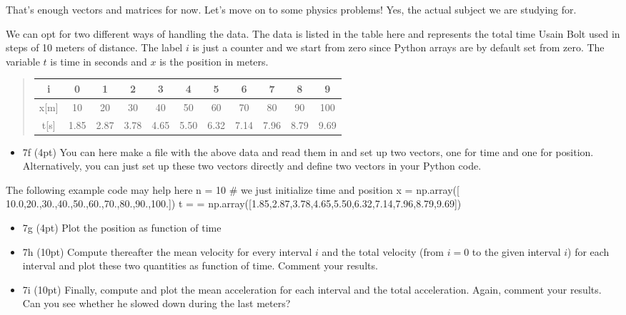 \documentclass[%
oneside,                 %
final,                   %
10pt]{article}
\begin{document}
That's enough vectors and matrices for now. Let's move on to some physics problems! Yes, the actual subject we are studying for. 

We can opt for two different ways of handling the data. The data is listed in the table here and represents the total time Usain Bolt used in steps of  10 meters of distance. The label $i$ is just a counter and we start from zero since Python arrays are by default set from zero. The variable $t$ is time in seconds and $x$ is the position in meters.


\begin{quote}
\begin{tabular}{ccccccccccc}
\hline
\multicolumn{1}{c}{ i } & \multicolumn{1}{c}{ 0 } & \multicolumn{1}{c}{ 1 } & \multicolumn{1}{c}{ 2 } & \multicolumn{1}{c}{ 3 } & \multicolumn{1}{c}{ 4 } & \multicolumn{1}{c}{ 5 } & \multicolumn{1}{c}{ 6 } & \multicolumn{1}{c}{ 7 } & \multicolumn{1}{c}{ 8 } & \multicolumn{1}{c}{ 9 } \\
\hline
x[m] & 10   & 20   & 30   & 40   & 50   & 60   & 70   & 80   & 90   & 100  \\
\hline
t[s] & 1.85 & 2.87 & 3.78 & 4.65 & 5.50 & 6.32 & 7.14 & 7.96 & 8.79 & 9.69 \\
\hline
\end{tabular}
\end{quote}

\noindent
\begin{itemize}
\item 7f (4pt) You can here make a file with the above data and read them in and set up two vectors, one for time and one for position. Alternatively, you can just set up these two vectors directly and define two vectors in your Python code.
\end{itemize}

\noindent
The following example code may help here
\bpycod
n = 10
# we just initialize time and position
x = np.array([ 10.0,20.,30.,40.,50.,60.,70.,80.,90.,100.])
t = = np.array([1.85,2.87,3.78,4.65,5.50,6.32,7.14,7.96,8.79,9.69])
\epycod

\begin{itemize}
\item 7g (4pt) Plot the position as function of time

\item 7h (10pt) Compute thereafter the mean velocity for every interval $i$ and the total velocity (from $i=0$ to the given interval $i$) for each interval and plot these two quantities as function of time. Comment your results.

\item 7i (10pt) Finally, compute and plot the mean acceleration for each interval and the total acceleration. Again, comment your results. Can you see whether he slowed down during the last meters? 
\end{itemize}

\noindent


\end{document}
